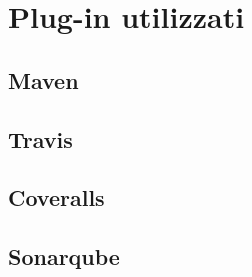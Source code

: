 \chapter{Plug-in utilizzati}
	\section{Maven}
	\section{Travis}
	\section{Coveralls}
	\section{Sonarqube}